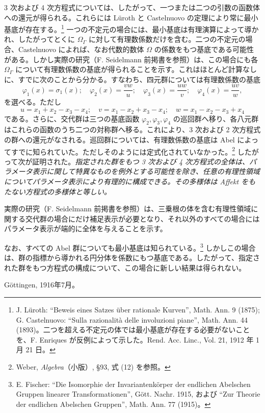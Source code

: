 \documentclass[11pt]{article}
\begin{document}
3 次および 4 次方程式については、したがって、一つまたは二つの引数の函数体への還元が得られる。これらには Lüroth と Castelnuovo の定理により常に最小基底が存在する。\footnote{J. Lüroth: ``Beweis eines Satzes über rationale Kurven'', Math. Ann. 9 (1875); G. Castelnuovo: ``Sulla razionalità delle involuzioni piane'', Math. Ann. 44 (1893)。二つを超える不定元の体では最小基底が存在する必要がないことを、F. Enriques が反例によって示した。Rend. Acc. Linc., Vol. 21, 1912 年 1 月 21 日。} 一つの不定元の場合には、最小基底は有理演算によって導かれ、したがってとくに $\Omega_\Gamma$ に対して有理数係数だけを含む。二つの不定元の場合、Castelnuovo によれば、なお代数的数体 $\Omega$ の係数をもつ基底である可能性がある。しかし実際の研究（F. Seidelmann 前掲書を参照）は、この場合にも各 $\Omega_\Gamma$ について有理数係数の基底が得られることを示す。これはほとんど計算なしに、すでに次のことから分かる。すなわち、四元群については有理数係数の基底
\[
\varphi_1(x)=\sigma_1(x);\quad
\varphi_2(x)=\frac{vw}{u};\quad
\varphi_3(x)=\frac{uw}{v};\quad
\varphi_4(x)=\frac{uv}{w},
\]
を選べる。ただし
\[
u=x_1+x_2-x_3-x_4;\quad v=x_1-x_2+x_3-x_4;\quad w=x_1-x_2-x_3+x_4
\]
である。さらに、交代群は三つの基底函数 $\varphi_2,\varphi_3,\varphi_4$ の巡回群へ移り、各八元群はこれらの函数のうち二つの対称群へ移る。これにより、3 次および 2 次方程式の群への還元がなされる。巡回群については、有理数係数の基底は Abel によってすでに知られていた。ただしそのようには定式化されていなかった。\footnote{Weber, \emph{Algebra}（小版）, \S 93, 式 (12) を参照。} したがって次が証明された。\emph{指定された群をもつ 3 次および 4 次方程式の全体は、パラメータ表示に関して特異なものを例外とする可能性を除き、任意の有理性領域についてパラメータ表示により有理的に構成できる。その多様体は Affekt をもたない方程式の多様体と等しい。}

実際の研究（F. Seidelmann 前掲書を参照）は、三乗根の体を含む有理性領域に関する交代群の場合にだけ補足表示が必要となり、それ以外のすべての場合にはパラメータ表示が端的に全体を与えることを示す。

なお、すべての Abel 群についても最小基底は知られている。\footnote{E. Fischer: ``Die Isomorphie der Invariantenkörper der endlichen Abelschen Gruppen linearer Transformationen'', Gött. Nachr. 1915, および ``Zur Theorie der endlichen Abelschen Gruppen'', Math. Ann. 77 (1915)。} しかしこの場合は、群の指標から導かれる円分体を係数にもつ基底である。したがって、指定された群をもつ方程式の構成について、この場合に新しい結果は得られない。

\medskip
\noindent Göttingen, 1916年7月。
\end{document}
